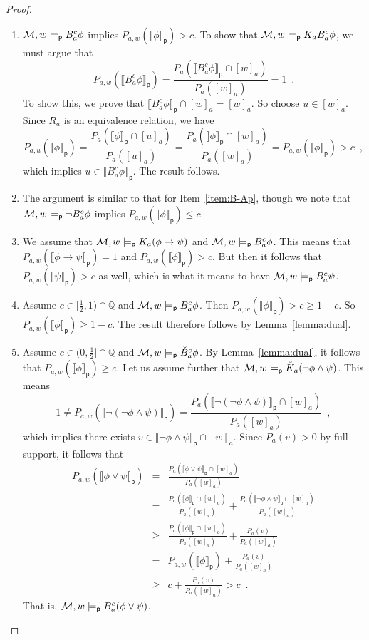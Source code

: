 \documentclass[12pt]{article}
\theoremstyle{definition}
\newcommand{\Rat}{\mathbb{Q}}  %
\newcommand{\M}{{\cal M}}      %
\newcommand{\modelsp}{\models_{\mathsf{p}}}                  %
\newcommand{\semp}[1]{\llbracket{#1}\rrbracket_{\mathsf{p}}} %
\begin{document}
\begin{proof}
\begin{enumerate}
  \item $\M,w\modelsp B_a^c\phi$ implies $P_{a,w}(\semp{\phi})>c$.  To show that
    $\M,w\modelsp K_aB_a^c\phi$, we must argue that
    \[
    P_{a,w}(\semp{B_a^c\phi})= 
    \frac{P_a(\semp{B_a^c\phi}\cap[w]_a)}{P_a([w]_a)}
    =1\enspace.
    \]
    To show this, we prove that
    $\semp{B_a^c\phi}\cap[w]_a=[w]_a$.
    So choose $u\in[w]_a$.  Since $R_a$ is an equivalence relation,
    we have
    \begin{equation*}
      P_{a,u}(\semp{\phi})=
      \frac{P_a(\semp{\phi}\cap[u]_a)}{P_a([u]_a)}=
      \frac{P_a(\semp{\phi}\cap[w]_a)}{P_a([w]_a)}=
      P_{a,w}(\semp{\phi})>c\enspace,
    \end{equation*}
    which implies $u\in\semp{B_a^c\phi}$.  The result follows.
    
  \item The argument is similar to that for Item~\ref{item:B-Ap},
    though we note that $\M,w\modelsp\lnot B_a^c\phi$ implies
    $P_{a,w}(\semp{\phi})\leq c$.
    
  \item We assume that $\M,w\modelsp K_a(\phi\to\psi)$ and
    $\M,w\modelsp B_a^c\phi$.  This means that
    $P_{a,w}(\semp{\phi\to\psi})=1$ and
    $P_{a,w}(\semp{\phi})>c$.  But then it follows that
    $P_{a,w}(\semp{\psi})>c$ as well, which is what it means to
    have $\M,w\modelsp B_a^c\psi$.


  \item Assume $c\in[\frac 12,1)\cap\Rat$ and $\M,w\modelsp B_a^c\phi$.  Then $P_{a,w}(\semp{\phi})>c
    \geq 1 - c$. So $P_{a,w}(\semp{\phi})\geq 1-c$.  The result
    therefore follows by Lemma~\ref{lemma:dual}.

  \item Assume $c\in(0,\frac 12]\cap\Rat$ and $\M,w\modelsp\check B^c_a\phi$.  By
    Lemma~\ref{lemma:dual}, it follows that
    $P_{a,w}(\semp{\phi})\geq c$.  Let us assume further that
    $\M,w\modelsp\check K_a(\lnot\phi\land\psi)$.  This means
    \[
    1\neq P_{a,w}(\semp{\lnot(\lnot\phi\land\psi)})=
    \frac{P_a(\semp{\lnot(\lnot\phi\land\psi)}\cap[w]_a)}{P_a([w]_a)}
    \enspace,
    \]
    which implies there exists $v\in
    \semp{\lnot\phi\land\psi}\cap[w]_a$.  Since $P_a(v)>0$ by full support, it follows that
    \begin{eqnarray*}
    P_{a,w}(\semp{\phi\lor\psi}) &=&
    \frac{ P_a(\semp{\phi\lor\psi}\cap [w]_a) }{ P_a([w]_a) }
    \\
    &=&
    \frac{ P_a(\semp{\phi}\cap [w]_a) }{ P_a([w]_a) } +
    \frac{ P_a(\semp{\lnot\phi\land\psi}\cap [w]_a) }{ P_a([w]_a) }
    \\
    &\geq&
    \frac{ P_a(\semp{\phi}\cap[w]_a) }{P_a([w]_a)} + \frac{ P_a(v) }{P_a([w]_a)}
    \\
    &=&
    P_{a,w}(\semp{\phi})+\frac{ P_a(v) }{P_a([w]_a)}
    \\
    &\geq&
    c + \frac{ P_a(v) }{P_a([w]_a)}
    > c\enspace.
    \end{eqnarray*}
    That is,
    $\M,w\modelsp B_a^c(\phi\lor\psi)$.


\end{enumerate}
\end{proof}
\end{document}

